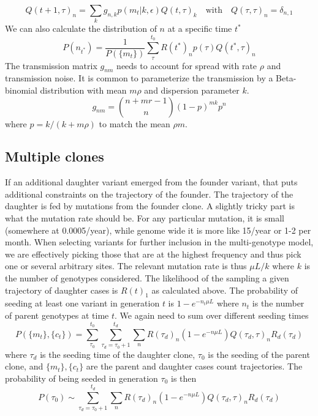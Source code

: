\documentclass[aps,rmp, onecolumn]{revtex4}
\begin{document}
\begin{equation}
    Q(t+1,\tau)_n = \sum_k g_{n,k} p(m_t|k,\epsilon) Q(t,\tau)_k  \quad \mathrm{with} \quad Q(\tau,\tau)_n = \delta_{n,1}
\end{equation}
We can also calculate the distribution of $n$ at a specific time $t^*$
\begin{equation}
    P(n_{t^*}) = \frac{1}{P(\{m_t\})}\sum_{\tau}^{t_0} R(t^*)_n p(\tau) Q(t^*,\tau)_n
\end{equation}
The transmission matrix $g_{nm}$ needs to account for spread with rate $\rho$ and transmission noise.
It is common to parameterize the transmission by a Beta-binomial distribution with mean $m\rho$ and dispersion parameter $k$.
\begin{equation}
    g_{nm} = {n + mr - 1 \choose n} (1-p)^{m k} p^n
\end{equation}
where $p=k/(k+m\rho)$ to match the mean $\rho m$.
\subsection*{Multiple clones}
If an additional daughter variant emerged from the founder variant, that puts additional constraints on the trajectory of the founder.
The trajectory of the daughter is fed by mutations from the founder clone.
A slightly tricky part is what the mutation rate should be.
For any particular mutation, it is small (somewhere at 0.0005/year), while genome wide it is more like 15/year or 1-2 per month.
When selecting variants for further inclusion in the multi-genotype model, we are effectively picking those that are at the highest frequency and thus pick one or several arbitrary sites.
The relevant mutation rate is thus $\mu L/k$ where $k$ is the number of genotypes considered.
The likelihood of the sampling a given trajectory of daughter cases is $R(t)_1$ as calculated above.
The probability of seeding at least one variant in generation $t$ is $1-e^{-n_t\mu L}$ where $n_t$ is the number of parent genotypes at time $t$.
We again need to sum over different seeding times
\begin{equation}
    P(\{m_t\}, \{c_t\}) = \sum_{\tau_0}^{t_0}\sum_{\tau_d=\tau_0+1}^{t_d} \sum_n  R(\tau_d)_n (1-e^{-n\mu L}) Q(\tau_d,\tau)_n R_d(\tau_d)
\end{equation}
where $\tau_d$ is the seeding time of the daughter clone, $\tau_0$ is the seeding of the parent clone, and $\{m_t\}, \{c_t\}$ are the parent and daughter cases count trajectories.
The probability of being seeded in generation $\tau_0$ is then
\begin{equation}
    P(\tau_0) \sim \sum_{\tau_d=\tau_0+1}^{t_d} \sum_n R(\tau_d)_n (1-e^{-n\mu L}) Q(\tau_d,\tau)_n R_d(\tau_d)
\end{equation}
\end{document}
